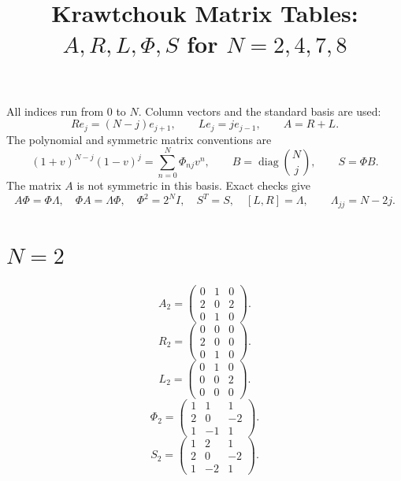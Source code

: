 \documentclass[11pt]{amsart}
\title{Krawtchouk Matrix Tables: $A,R,L,\Phi,S$ for $N=2,4,7,8$}
\date{}
\begin{document}
\maketitle
All indices run from $0$ to $N$. Column vectors and the standard basis are used:
\[
R e_j=(N-j)e_{j+1},\qquad L e_j=j e_{j-1},\qquad A=R+L.
\]
The polynomial and symmetric matrix conventions are
\[
(1+v)^{N-j}(1-v)^j=\sum_{n=0}^N\Phi_{nj}v^n,
\qquad B=\operatorname{diag}\binom Nj,\qquad S=\Phi B.
\]
The matrix $A$ is not symmetric in this basis. Exact checks give
\[
A\Phi=\Phi\Lambda,\quad\Phi A=\Lambda\Phi,\quad
\Phi^2=2^NI,\quad S^T=S,\quad [L,R]=\Lambda,
\qquad \Lambda_{jj}=N-2j.
\]
\section*{$N=2$}
\[
A_{2}=\begin{pmatrix}
0 & 1 & 0 \\
2 & 0 & 2 \\
0 & 1 & 0
\end{pmatrix}.
\]
\[
R_{2}=\begin{pmatrix}
0 & 0 & 0 \\
2 & 0 & 0 \\
0 & 1 & 0
\end{pmatrix}.
\]
\[
L_{2}=\begin{pmatrix}
0 & 1 & 0 \\
0 & 0 & 2 \\
0 & 0 & 0
\end{pmatrix}.
\]
\[
\Phi_{2}=\begin{pmatrix}
1 & 1 & 1 \\
2 & 0 & -2 \\
1 & -1 & 1
\end{pmatrix}.
\]
\[
S_{2}=\begin{pmatrix}
1 & 2 & 1 \\
2 & 0 & -2 \\
1 & -2 & 1
\end{pmatrix}.
\]
\end{document}
